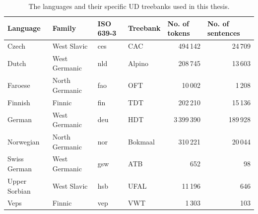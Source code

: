 \begin{table}[ht]
	\centering
	\begin{tabular}{llllrr}
		\toprule
		\textbf{Language} & \textbf{Family} & \textbf{ISO 639-3} & \textbf{Treebank} & \multicolumn{1}{l}{\textbf{No. of tokens}} & \multicolumn{1}{l}{\textbf{No. of sentences}} \\
		\midrule
			Czech & West Slavic & ces & CAC & 494\,142 & 24\,709 \\
			Dutch & West Germanic & nld & Alpino & 208\,745 & 13\,603 \\
			Faroese & North Germanic & fao & OFT & 10\,002 & 1\,208 \\
			Finnish & Finnic & fin & TDT & 202\,210 & 15\,136 \\
			German & West Germanic & deu & HDT & 3\,399\,390 & 189\,928 \\
			Norwegian & North Germanic & nor & Bokmaal & 310\,221 & 20\,044\\
			Swiss German & West Germanic & gsw & ATB & 652 & 98\\
			Upper Sorbian & West Slavic & hsb & UFAL & 11\,196 & 646 \\
			Veps & Finnic & vep & VWT & 1\,303 & 103 \\
		\bottomrule
	\end{tabular}
	\caption{The languages and their specific UD treebanks used in this thesis.}
	\label{tab:languages}
\end{table}